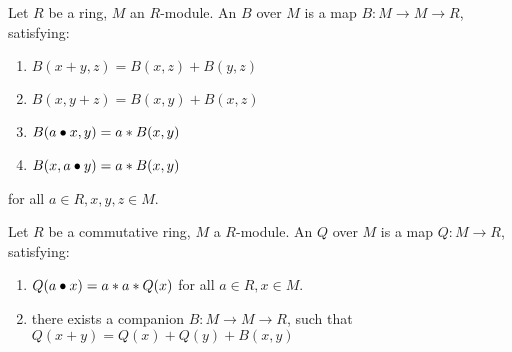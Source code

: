 \begin{definition}
    \label{BilinForm}
    \leanok

    Let $R$ be a ring, $M$ an $R$-module. An  $B$ over $M$ is a map $B : M \to M \to R$, satisfying:

    \begin{enumerate}

    \item $ B(x + y, z) = B(x, z) +B(y, z) $
    
    \item $ B(x, y + z) = B(x, y) +B(x, z) $
    
    \item $ B(a \bullet x, y) = a * B(x, y)$
    
    \item $ B(x, a \bullet y) = a * B(x, y)$
        
    \end{enumerate}

    for all $a \in R, x, y, z \in M$.

\end{definition}

\begin{definition}
    \label{QuadraticForm}
    \leanok

    Let $R$ be a commutative ring, $M$ a $R$-module. An  $Q$ over $M$ is a map $Q : M \to R$, satisfying:

    \begin{enumerate}

    \item $ Q(a \bullet x) = a * a * Q(x)$ for all $a \in R, x \in M$.
    
    \item there exists a companion  $B : M \to M \to R$, such that $Q(x + y) = Q(x) + Q(y) + B(x, y)$
    
    \end{enumerate}
\end{definition}